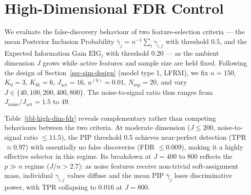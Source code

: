 \documentclass[
  letterpaper,
  DIV=11,
  numbers=noendperiod]{scrartcl}
\begin{document}
\section{High-Dimensional FDR Control}\label{sec-high-dim-fdr}

We evaluate the false-discovery behaviour of two feature-selection
criteria --- the mean Posterior Inclusion Probability
\(\bar{\gamma}_j = n^{-1}\sum_i \gamma_{i,j}\) with threshold \(0.5\),
and the Expected Information Gain \(\text{EIG}_j\) with threshold
\(0.20\) --- as the ambient dimension \(J\) grows while active features
and sample size are held fixed. Following the design of
Section~\ref{sec-sim-design} (model type 1, LFRM), we fix \(n = 150\),
\(K_0 = 3\), \(K_{\text{fit}} = 6\), \(J_{\text{act}} = 16\),
\(u^{(0)} = 0.01\), \(N_{\text{rep}} = 20\), and vary
\(J \in \{40, 100, 200, 400, 800\}\). The noise-to-signal ratio thus
ranges from \(J_{\text{noise}} / J_{\text{act}} = 1.5\) to \(49\).

\begin{table}

\caption{\label{tbl-high-dim-fdr}TPR and FDR for PIP- and EIG-based
feature selection as a function of total dimension \(J\) (\(n = 150\),
\(K_0 = 3\), \(J_{\text{act}} = 16\), LFRM, 20 replications). Bold:
better value in each column pair (lower FDR; higher TPR).}


\end{table}%

Table~\ref{tbl-high-dim-fdr} reveals complementary rather than competing
behaviours between the two criteria. At moderate dimension
(\(J \le 200\), noise-to-signal ratio \(\le 11.5\)), the PIP threshold
\(0.5\) achieves near-perfect detection (TPR \(\approx 0.97\)) with
essentially no false discoveries (FDR \(\le 0.009\)), making it a highly
effective selector in this regime. Its breakdown at \(J = 400\) to
\(800\) reflects the \(p \gg n\) regime (\(J/n > 2.7\)): as noise
features receive non-trivial soft-assignment mass, individual
\(\gamma_{i,j}\) values diffuse and the mean PIP \(\bar{\gamma}_j\)
loses discriminative power, with TPR collapsing to \(0.016\) at
\(J = 800\).
\end{document}
